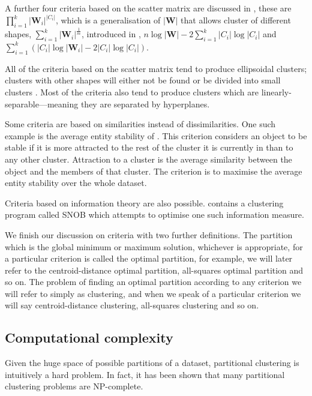 \documentclass[a4paper]{report}
\begin{document}
A further four criteria based on the scatter matrix are discussed in
\citep{marriott1982optimization}, these are
$\prod_{i=1}^{k}|\mathbf{W}_i|^{|C_i|}$, which is a generalisation of
$|\mathbf{W}|$ that allows cluster of different shapes,
$\sum_{i=1}^{k}|\mathbf{W}_i|^{\frac{1}{m}}$, introduced in
\citep{maronna1974}, $n \log{|\mathbf{W}|} - 2\sum_{i=1}^{k} |C_i|
\log{|C_i|}$ and $\sum_{i=1}^{k} (|C_i| \log{|\mathbf{W}_i|} -
2|C_i|\log{|C_i|})$.

All of the criteria based on the scatter matrix tend to produce ellipsoidal
clusters; clusters with other shapes will either not be found or be divided
into small clusters \citep{marriott1982optimization}.  Most of the criteria
also tend to produce clusters which are linearly-separable---meaning they are
separated by hyperplanes.

Some criteria are based on similarities instead of dissimilarities.  One such
example is the average entity stability of \citep{Rubin67optimal}.  This
criterion considers an object to be stable if it is more attracted to the rest
of the cluster it is currently in than to any other cluster.  Attraction to a
cluster is the average similarity between the object and the members of that
cluster.  The criterion is to maximise the average entity stability over the
whole dataset.

Criteria based on information theory are also possible.
\citet{wallace1968information} contains a clustering program called SNOB which
attempts to optimise one such information measure.

We finish our discussion on criteria with two further definitions.  The
partition which is the global minimum or maximum solution, whichever is
appropriate, for a particular criterion is called the optimal partition, for
example, we will later refer to the centroid-distance optimal partition,
all-squares optimal partition and so on.  The problem of finding an optimal
partition according to any criterion we will refer to simply as clustering,
and when we speak of a particular criterion we will say centroid-distance
clustering, all-squares clustering and so on.

\subsection{Computational complexity}
\label{sec:complexity-issues}

Given the huge space of possible partitions of a dataset, partitional
clustering is intuitively a hard problem.  In fact, it has been shown that
many partitional clustering problems are NP-complete.
\end{document}
